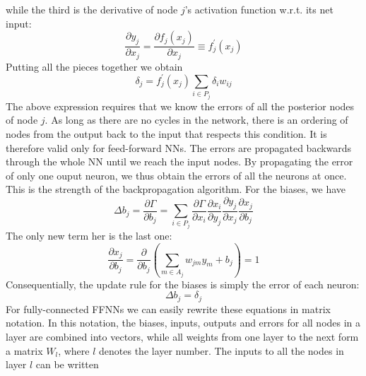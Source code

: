 \documentclass[twoside,english]{uiofysmaster}
\begin{document}
while the third is the derivative of node $j$'s activation function w.r.t. its net input:
\begin{equation}
 \frac{\partial y_j}{\partial x_j} = \frac{\partial f_j(x_j)}{\partial x_j} \equiv f_j^\prime (x_j)
\end{equation}
Putting all the pieces together we obtain
\begin{equation}
 \delta_j = f_j^\prime(x_j)\sum_{i\in P_j} \delta_i w_{ij}
 \label{backProp}
\end{equation}
The above expression requires that we know the errors of all the posterior nodes
of node $j$. As long as there are no cycles in the network, there is an ordering of nodes from the output back to the 
input that respects this condition. It is therefore valid only for feed-forward NNs.
The errors are propagated backwards through the whole NN until we reach the input nodes. By propagating the error
of only one ouput neuron, we thus obtain the errors of all the neurons at once. This is the strength of the backpropagation
algorithm. 
For the biases, we have
\begin{equation}
 \Delta b_j = \frac{\partial \Gamma}{\partial b_j} = \sum_{i\in P_j} \frac{\partial \Gamma}{\partial x_i}
	      \frac{\partial x_i}{\partial y_j} \frac{\partial y_j}{\partial x_j} \frac{\partial x_j}{\partial b_j}
\end{equation}
The only new term her is the last one:
\begin{equation}
 \frac{\partial x_j}{\partial b_j} = \frac{\partial}{\partial b_j}\left(\sum_{m\in A_j} w_{jm}y_m + b_j\right) = 1
\end{equation}
Consequentially, the update rule for the biases is simply the error of each neuron:
\begin{equation}
 \Delta b_j = \delta_j
\end{equation}
For fully-connected FFNNs we can easily rewrite these equations in matrix notation. In this notation, 
the biases, inputs, outputs and errors for all nodes in a layer are combined into vectors, while all weights from 
one layer to the next form a matrix $W_l$, where $l$ denotes the layer number. The inputs to all the nodes in 
layer $l$ can be written
\end{document}
